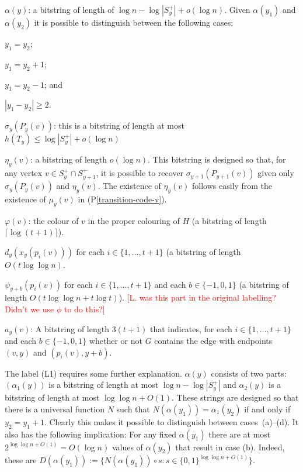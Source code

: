 \documentclass{patmorin}
\newcommand{\pref}[1]{(P\ref{#1})}
\begin{document}
\begin{compactenum}[(L1)]
    \item $\alpha(y)$: a bitstring of length of $\log n-\log |S^+_y|+o(\log n)$.  Given $\alpha(y_1)$ and $\alpha(y_2)$ it is possible to distinguish between the following cases:
    \begin{inparaenum}
        \item $y_1=y_2$;
        \item $y_1=y_2+1$;
        \item $y_1=y_2-1$; and
        \item $|y_1-y_2|\ge 2$.
    \end{inparaenum}

    \item $\sigma_y(P_y(v))$: this is a bitstring of length at most $h(T_y)\le \log|S^+_y| + o(\log n)$

    \item $\eta_y(v)$: a bitstring of length $o(\log n)$.  This bitstring is designed so that, for any vertex $v\in S^+_y\cap S^+_{y+1}$, it is possible to recover $\sigma_{y+1}(P_{y+1}(v))$ given only $\sigma_y(P_y(v))$ and $\eta_y(v)$.  The existence of $\eta_y(v)$ follows easily from the existence of $\mu_y(v)$ in \pref{transition-code-v}.

    \item $\varphi(v)$: the colour of $v$ in the proper colouring of $H$ (a bitstring of length $\lceil\log(t+1)\rceil$).

    \item $d_y(x_y(p_i(v)))$ for each $i\in\{1,\ldots,t+1\}$ (a bitstring of length $O(t\log\log n)$.

    \item $\psi_{y+b}(p_i(v))$ for each $i\in\{1,\ldots,t+1\}$ and each $b\in\{-1,0,1\}$ (a bitstring of length $O(t\log\log n + t\log t)$).\label{psi} \textcolor{red}{[L. was this part in the original labelling? Didn't we use $\phi$ to do this?]}

    \item $a_y(v)$: A bitstring of length $3(t+1)$ that indicates, for each $i\in\{1,\ldots,t+1\}$ and each $b\in\{-1,0,1\}$ whether or not $G$ contains the edge with endpoints $(v,y)$ and $(p_i(v),y+b)$.
\end{compactenum}

The label (L1) requires some further explanation. $\alpha(y)$ consists of two parts: $(\alpha_1(y))$ is a bitstring of length at most $\log n-\log |S^+_y|$ and $\alpha_2(y)$ is a bitstring of length at most $\log\log n+O(1)$.  These strings are designed so that there is a universal function $N$ such that $N(\alpha(y_1))=\alpha_1(y_2)$ if and only if $y_2=y_1+1$.  Clearly this makes it possible to distinguish between cases~(a)--(d).  It also has the following implication:  For any fixed $\alpha(y_1)$ there are at most $2^{\log \log n+O(1)}=O(\log n)$ values of $\alpha(y_2)$ that result in case (b).  Indeed, these are $D(\alpha(y_1)):=\{N(\alpha(y_1))\mathbin{\circ} s: s\in\{0,1\}^{\log\log n+O(1)}\}$.
\end{document}
